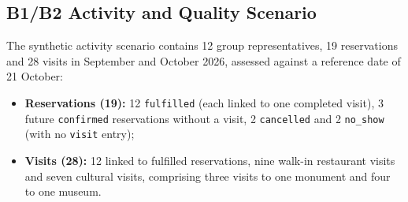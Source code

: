 \subsection{B1/B2 Activity and Quality Scenario}
The synthetic activity scenario contains 12 group representatives, 19 reservations and 28 visits in September and October 2026, assessed against a reference date of 21 October:
\begin{itemize}
\item \textbf{Reservations (19):} 12 \texttt{fulfilled} (each linked to one completed visit), 3 future \texttt{confirmed} reservations without a visit, 2 \texttt{cancelled} and 2 \texttt{no\_\allowbreak{}show} (with no \texttt{visit} entry);
\item \textbf{Visits (28):} 12 linked to fulfilled reservations, nine walk-in restaurant visits and seven cultural visits, comprising three visits to one monument and four to one museum.
\end{itemize}
